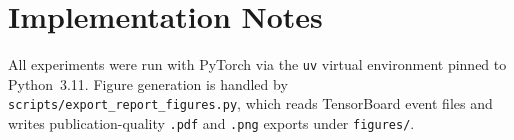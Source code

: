 \documentclass{article}
\begin{document}
\section{Implementation Notes}

All experiments were run with PyTorch via the \texttt{uv} virtual environment
pinned to Python~3.11.  Figure generation is handled by
\texttt{scripts/export\_report\_figures.py}, which reads TensorBoard event
files and writes publication-quality \texttt{.pdf} and \texttt{.png} exports
under \texttt{figures/}.
\end{document}
